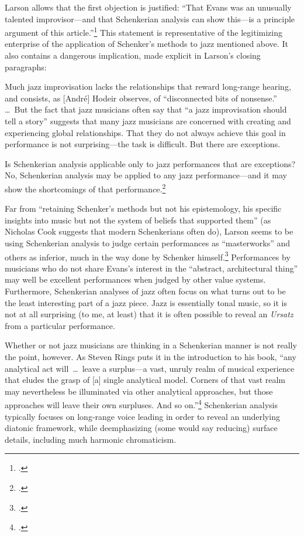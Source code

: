 \documentclass[diss]{subfiles}
\begin{document}
Larson allows that the first objection is justified: “That Evans was an
unusually talented improvisor---and that Schenkerian analysis can show
this---is a principle argument of this article.”\footcite[239]{larson:1998}
This statement is representative of the legitimizing enterprise of the
application of Schenker’s methods to jazz mentioned above. It also contains a
dangerous implication, made explicit in Larson’s closing paragraphs:
\begin{quoting}
  \singlespacing
  Much jazz improvisation lacks the relationships that reward long-range
  hearing, and consists, as [André] Hodeir observes, of “disconnected bits of
  nonsense.” \ldots\ But the fact that jazz musicians often say that “a jazz
  improvisation should tell a story” suggests that many jazz musicians are
  concerned with creating and experiencing global relationships. That they do
  not always achieve this goal in performance is not surprising---the task is
  difficult. But there are exceptions.

  Is Schenkerian analysis applicable only to jazz performances that are
  exceptions? No, Schenkerian analysis may be applied to any jazz
  performance---and it may show the shortcomings of that
  performance.\footcite[240--41]{larson:1998}
\end{quoting}

Far from “retaining Schenker’s methods but not his epistemology, his specific
insights into music but not the system of beliefs that supported them” (as
Nicholas Cook suggests that modern Schenkerians often do), Larson seems to be
using Schenkerian analysis to judge certain performances as “masterworks” and
others as inferior, much in the way done by Schenker
himself.\footcite[439]{cook:1989} Performances by musicians who do not share
Evans’s interest in the “abstract, architectural thing” may well be excellent
performances when judged by other value systems.  Furthermore,
Schenkerian analyses of jazz often focus on what turns out to be the least
interesting part of a jazz piece. Jazz is essentially tonal music, so it is
not at all surprising (to me, at least) that it is often possible to reveal
an \emph{Ursatz} from a particular performance.

Whether or not jazz musicians are thinking in a Schenkerian manner is not
really the point, however. As Steven Rings puts it in the introduction to his
book, “any analytical act will~\ldots\ leave a surplus---a vast, unruly realm
of musical experience that eludes the grasp of [a] single analytical model.
Corners of that vast realm may nevertheless be illuminated via other
analytical approaches, but those approaches will leave their own surpluses.
And so on.”\footcite[5]{rings:2011} Schenkerian analysis typically focuses on
long-range voice leading in order to reveal an underlying diatonic framework,
while deemphasizing (some would say reducing) surface details, including much
harmonic chromaticism.
\end{document}

